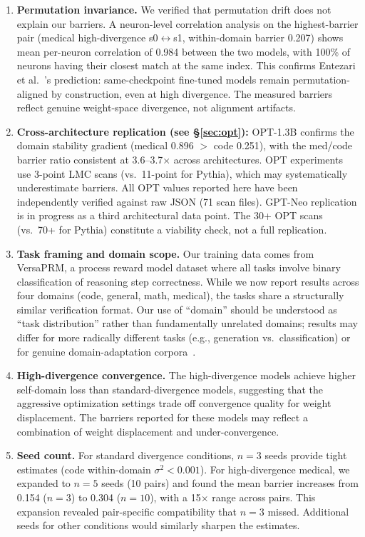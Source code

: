 \documentclass[11pt,a4paper]{article}
\begin{document}
\begin{enumerate}
    \item \textbf{Permutation invariance.} We verified that permutation drift does not explain our barriers. A neuron-level correlation analysis on the highest-barrier pair (medical high-divergence s0$\leftrightarrow$s1, within-domain barrier 0.207) shows mean per-neuron correlation of 0.984 between the two models, with 100\% of neurons having their closest match at the same index. This confirms Entezari et al.~\cite{entezari2022permutation}'s prediction: same-checkpoint fine-tuned models remain permutation-aligned by construction, even at high divergence. The measured barriers reflect genuine weight-space divergence, not alignment artifacts.

\item \textbf{Cross-architecture replication (see \S\ref{sec:opt}):} OPT-1.3B confirms the domain stability gradient (medical 0.896 $>$ code 0.251), with the med/code barrier ratio consistent at 3.6--3.7$\times$ across architectures. OPT experiments use 3-point LMC scans (vs.\ 11-point for Pythia), which may systematically underestimate barriers. All OPT values reported here have been independently verified against raw JSON (71 scan files). GPT-Neo replication is in progress as a third architectural data point. The 30+ OPT scans (vs.\ 70+ for Pythia) constitute a viability check, not a full replication.

    \item \textbf{Task framing and domain scope.} Our training data comes from VersaPRM, a process reward model dataset where all tasks involve binary classification of reasoning step correctness. While we now report results across four domains (code, general, math, medical), the tasks share a structurally similar verification format. Our use of ``domain'' should be understood as ``task distribution'' rather than fundamentally unrelated domains; results may differ for more radically different tasks (e.g., generation vs.\ classification) or for genuine domain-adaptation corpora~\cite{gururangan2020dapt}.

    \item \textbf{High-divergence convergence.} The high-divergence models achieve higher self-domain loss than standard-divergence models, suggesting that the aggressive optimization settings trade off convergence quality for weight displacement. The barriers reported for these models may reflect a combination of weight displacement and under-convergence.

    \item \textbf{Seed count.} For standard divergence conditions, $n = 3$ seeds provide tight estimates (code within-domain $\sigma^2 < 0.001$). For high-divergence medical, we expanded to $n = 5$ seeds (10 pairs) and found the mean barrier increases from 0.154 ($n = 3$) to 0.304 ($n = 10$), with a 15$\times$ range across pairs. This expansion revealed pair-specific compatibility that $n = 3$ missed. Additional seeds for other conditions would similarly sharpen the estimates.
\end{enumerate}
\end{document}
